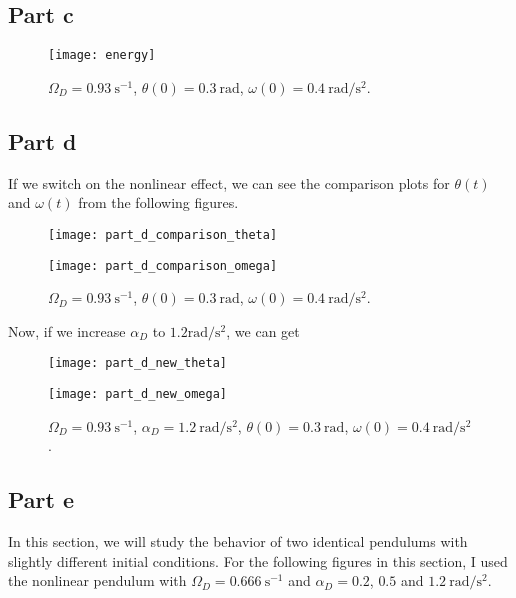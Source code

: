 \documentclass[a4paper]{article}
\begin{document}
	\subsection{Part c}
	\begin{figure}[H]
		\centering
		\texttt{[image: energy]}
		\caption{$\Omega_D = 0.93 \mathrm{~s^{-1}}$, $\theta(0) = 0.3\mathrm{~rad}$, $\omega(0) = 0.4 \mathrm{~rad/s^2}$.}
		\label{energy}
	\end{figure}
	\subsection{Part d}	\label{partd}
	If we switch on the nonlinear effect, we can see the comparison plots for $\theta(t)$ and $\omega(t)$ from the following figures.
	 \begin{figure}[H]
		\centering
		\texttt{[image: part\_d\_comparison\_theta]}
		\caption{$\Omega_D = 0.93 \mathrm{~s^{-1}}$, $\theta(0) = 0.3\mathrm{~rad}$, $\omega(0) = 0.4 \mathrm{~rad/s^2}$.}
		\label{theta}
		\texttt{[image: part\_d\_comparison\_omega]}
		\caption{$\Omega_D = 0.93 \mathrm{~s^{-1}}$, $\theta(0) = 0.3\mathrm{~rad}$, $\omega(0) = 0.4 \mathrm{~rad/s^2}$.}
		\label{omega}
	\end{figure}
	\newpage
	Now, if we increase $\alpha _D$ to $1.2 \mathrm{rad/s^2}$, we can get
	 \begin{figure}[H]
		\centering
		\texttt{[image: part\_d\_new\_theta]}
		\caption{$\Omega_D = 0.93 \mathrm{~s^{-1}}$, $\alpha_D = 1.2 \mathrm{~rad/s^2}$， $\theta(0) = 0.3\mathrm{~rad}$, $\omega(0) = 0.4 \mathrm{~rad/s^2}$.}
		\label{newtheta}
		\texttt{[image: part\_d\_new\_omega]}
		\caption{$\Omega_D = 0.93 \mathrm{~s^{-1}}$, $\alpha_D = 1.2 \mathrm{~rad/s^2}$, $\theta(0) = 0.3\mathrm{~rad}$, $\omega(0) = 0.4 \mathrm{~rad/s^2}$.}
		\label{newomega}
	\end{figure}
	\newpage
	\subsection{Part e} \label{parte}
	In this section, we will study the behavior of two identical pendulums with slightly different initial conditions. For the following figures in this section, I used the nonlinear pendulum with $\Omega _D = 0.666\mathrm{~s^{-1}}$ and $\alpha _D = 0.2$, $0.5$ and $1.2\mathrm{~rad/s^2}$.
\end{document}
